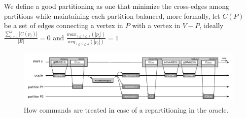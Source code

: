 We define a good partitioning as one that minimize the cross-edges among partitions while maintaining each partition balanced, more formally, let $C(P)$ be a set of edges connecting a vertex in $P$ with a vertex in $V - P$, ideally $\frac{\sum_{i=1}^{k}|C(p_i)|}{|E|} = 0$ and $\frac{max_{1 \leq i \leq k}(|p_i|)}{avg_{1 \leq i \leq k}(|p_i|)} = 1$


%
%
%
%




\begin{figure}
\begin{minipage}[b]{1\linewidth} %
\centering
      \includegraphics[width=1.0\linewidth]{figures/repartitioning}
\end{minipage}
\caption{How commands are treated in case of a repartitioning in the oracle.}
\label{fig:oracle_repartition}
\end{figure}
